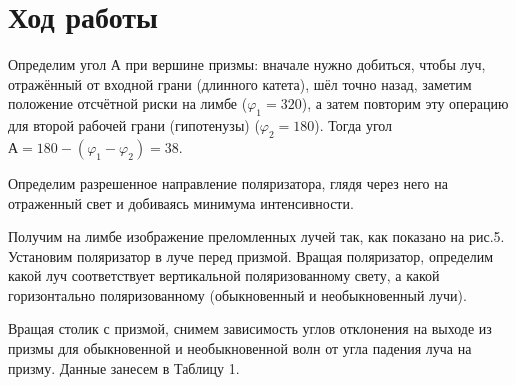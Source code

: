 \documentclass[a4paper,12pt]{article}
\begin{document}
\section*{Ход работы}

Определим угол А при вершине призмы: вначале нужно добиться, чтобы луч, отражённый от входной грани (длинного катета), шёл точно назад, заметим положение отсчётной риски на лимбе ($\varphi_1 = 320$\textdegree), а затем повторим эту операцию для второй рабочей грани (гипотенузы) ($\varphi_2 = 180$\textdegree). Тогда угол $А = 180 - (\varphi_1 - \varphi_2) = 38$\textdegree.

Определим разрешенное направление поляризатора, глядя через него на отраженный свет и добиваясь минимума интенсивности.

Получим на лимбе изображение преломленных лучей так, как показано на рис.5. Установим поляризатор в луче перед призмой. Вращая поляризатор, определим какой луч соответствует вертикальной поляризованному свету, а какой горизонтально поляризованному (обыкновенный и необыкновенный лучи).

Вращая столик с призмой, снимем зависимость углов отклонения на выходе из призмы для обыкновенной и необыкновенной волн от угла падения луча на призму. Данные занесем в Таблицу 1.
\end{document}
